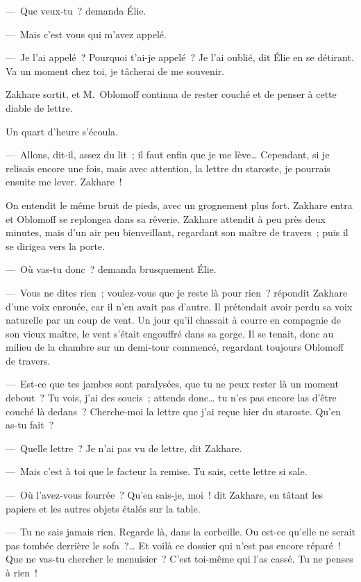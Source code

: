 \documentclass[french,twoside]{book} %
\begin{document}
— Que veux-tu ? demanda Élie.\par
— Mais c’est vous qui m’avez appelé.\par
— Je l’ai appelé ? Pourquoi t’ai-je appelé ? Je l’ai oublié, dit Élie en se détirant. Va un moment chez toi, je tâcherai de me souvenir.\par
Zakhare sortit, et M. Oblomoff continua de rester couché et de penser à cette diable de lettre.\par
Un quart d’heure s’écoula.\par
— Allons, dit-il, assez du lit ; il faut enfin que je me lève… Cependant, si je relisais encore une fois, mais avec attention, la lettre du staroste, je pourrais ensuite me lever. Zakhare !\par
On entendit le même bruit de pieds, avec un grognement plus fort. Zakhare entra et Oblomoff se replongea dans sa rêverie. Zakhare attendit à peu près deux minutes, mais d’un air peu bienveillant, regardant son maître de travers ; puis il se dirigea vers la porte.\par
— Où vas-tu donc ? demanda brusquement Élie.\par
— Vous ne dites rien ; voulez-vous que je reste là pour rien ? répondit Zakhare d’une voix enrouée, car il n’en avait pas d’autre. Il prétendait avoir perdu sa voix naturelle par un coup de vent. Un jour qu’il chassait à courre en compagnie de son vieux maître, le vent s’était engouffré dans sa gorge. Il se tenait, donc au milieu de la chambre sur un demi-tour commencé, regardant toujours Oblomoff de travers.\par
— Est-ce que tes jambes sont paralysées, que tu ne peux rester là un moment debout ? Tu vois, j’ai des soucis ; attends donc… tu n’es pas encore las d’être couché là dedans ? Cherche-moi la lettre que j’ai reçue hier du staroste. Qu’en as-tu fait ?\par
— Quelle lettre ? Je n’ai pas vu de lettre, dit Zakhare.\par
— Mais c’est à toi que le facteur la remise. Tu sais, cette lettre si sale.\par
— Où l’avez-vous fourrée ? Qu’en sais-je, moi ! dit Zakhare, en tâtant les papiers et les autres objets étalés sur la table.\par
— Tu ne sais jamais rien. Regarde là, dans la corbeille. Ou est-ce qu’elle ne serait pas tombée derrière le sofa ?… Et voilà ce dossier qui n’est pas encore réparé ! Que ne vas-tu chercher le menuisier ? C’est toi-même qui l’as cassé. Tu ne penses à rien !\par
\end{document}
